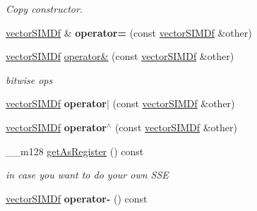 \begin{DoxyCompactItemize}
\begin{DoxyCompactList}\small\item\em Copy constructor. \end{DoxyCompactList}\item 
\hyperlink{classirr_1_1core_1_1vectorSIMDf}{vector\+S\+I\+M\+Df} \& {\bfseries operator=} (const \hyperlink{classirr_1_1core_1_1vectorSIMDf}{vector\+S\+I\+M\+Df} \&other)\hypertarget{classirr_1_1core_1_1vectorSIMDf_a351bff66d7665f25093dfa8591305e2c}{}\label{classirr_1_1core_1_1vectorSIMDf_a351bff66d7665f25093dfa8591305e2c}

\item 
\hyperlink{classirr_1_1core_1_1vectorSIMDf}{vector\+S\+I\+M\+Df} \hyperlink{classirr_1_1core_1_1vectorSIMDf_af0116c350c997a28daf510f62ef4be65}{operator\&} (const \hyperlink{classirr_1_1core_1_1vectorSIMDf}{vector\+S\+I\+M\+Df} \&other)\hypertarget{classirr_1_1core_1_1vectorSIMDf_af0116c350c997a28daf510f62ef4be65}{}\label{classirr_1_1core_1_1vectorSIMDf_af0116c350c997a28daf510f62ef4be65}

\begin{DoxyCompactList}\small\item\em bitwise ops \end{DoxyCompactList}\item 
\hyperlink{classirr_1_1core_1_1vectorSIMDf}{vector\+S\+I\+M\+Df} {\bfseries operator$\vert$} (const \hyperlink{classirr_1_1core_1_1vectorSIMDf}{vector\+S\+I\+M\+Df} \&other)\hypertarget{classirr_1_1core_1_1vectorSIMDf_aca0970eaae50dcad5dee6ce87b1c5728}{}\label{classirr_1_1core_1_1vectorSIMDf_aca0970eaae50dcad5dee6ce87b1c5728}

\item 
\hyperlink{classirr_1_1core_1_1vectorSIMDf}{vector\+S\+I\+M\+Df} {\bfseries operator$^\wedge$} (const \hyperlink{classirr_1_1core_1_1vectorSIMDf}{vector\+S\+I\+M\+Df} \&other)\hypertarget{classirr_1_1core_1_1vectorSIMDf_ad16184ea2e41c651df003ff757480380}{}\label{classirr_1_1core_1_1vectorSIMDf_ad16184ea2e41c651df003ff757480380}

\item 
\+\_\+\+\_\+m128 \hyperlink{classirr_1_1core_1_1vectorSIMDf_ae8eaf4bc69acea0950948c38c16498a8}{get\+As\+Register} () const \hypertarget{classirr_1_1core_1_1vectorSIMDf_ae8eaf4bc69acea0950948c38c16498a8}{}\label{classirr_1_1core_1_1vectorSIMDf_ae8eaf4bc69acea0950948c38c16498a8}

\begin{DoxyCompactList}\small\item\em in case you want to do your own S\+SE \end{DoxyCompactList}\item 
\hyperlink{classirr_1_1core_1_1vectorSIMDf}{vector\+S\+I\+M\+Df} {\bfseries operator-\/} () const \hypertarget{classirr_1_1core_1_1vectorSIMDf_a22f8deafd25ba8b4aa1d3d703e2702ae}{}\label{classirr_1_1core_1_1vectorSIMDf_a22f8deafd25ba8b4aa1d3d703e2702ae}


\end{DoxyCompactItemize}

